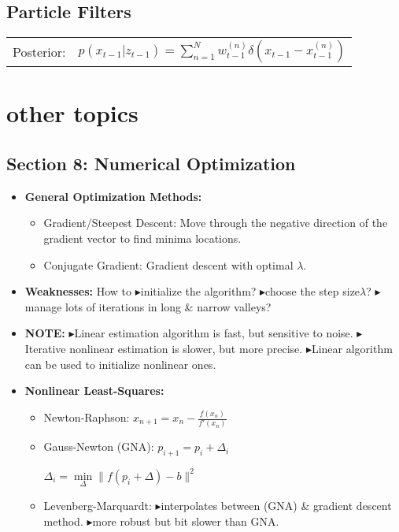 \documentclass{../cheat}
\def \itm{{\tiny$\blacktriangleright$}}
\begin{document}
\begin{multicols}{3}
\subsection{Particle Filters}
	\begin{tabularx}{\columnwidth}{l X}
		Posterior:& $p(x_{t-1}|z_{t-1})=\sum_{n=1}^N w_{t-1}^{(n)} \delta(x_{t-1}-x_{t-1}^{(n)})$\\
	\end{tabularx}
\section{other topics}
	\subsection{Section 8: Numerical Optimization}
	\begin{itemize}[nolistsep, leftmargin=1em]
		\item \textbf{General Optimization Methods:}
			\begin{itemize}
				\item Gradient/Steepest Descent: Move through the negative direction of the gradient vector to find minima locations.
				\item Conjugate Gradient: Gradient descent with optimal $\lambda$.
			\end{itemize}
		
		\item \textbf{Weaknesses:} How to 
			\itm initialize the algorithm?
			\itm choose the step size$\lambda$?
			\itm manage lots of iterations in long \& narrow valleys?
		
		\item \textbf{NOTE:}
			\itm Linear estimation algorithm is fast, but sensitive to noise.
			\itm Iterative nonlinear estimation is slower, but more precise.
			\itm Linear algorithm can be used to initialize nonlinear ones.
		
		\item \textbf{Nonlinear Least-Squares:}
			\begin{itemize}
				\item Newton-Raphson: $x_{n+1}=x_n-\frac{f(x_n)}{f'(x_n)}$
				\item Gauss-Newton (GNA): $p_{i+1}=p_i+\Delta_i$ \\
					\centerline{$\Delta_i=\min \limits _{\Delta}\parallel f(p_i+\Delta)-b\parallel^2 $}
				\item Levenberg-Marquardt: 
					\itm interpolates between (GNA) \& gradient descent method.
					\itm more robust but bit slower than GNA.
			\end{itemize}
	\end{itemize}
	

\end{multicols}
\end{document}
